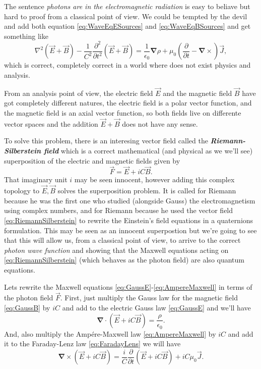     The sentence \textit{photons are in the electromagnetic radiation} is easy to beliave but hard to proof from a classical point of view. We could be tempted by the devil and add both equation \ref{eq:WaveEqESources} and \ref{eq:WaveEqBSources} and get something like
    \begin{equation}\label{eq:WaveEqDevil}
        \nabla^2\left(\vec{E}+\vec{B}\right)- \frac{1}{C^2}\frac{\partial^2}{\partial t^2} \left(\vec{E}+\vec{B}\right) = \frac{1}{\epsilon_0}\bm{\nabla}\rho + \mu_0 \left(\frac{\partial}{\partial t} - \bm{\nabla}\times \right)\vec{J},
    \end{equation}
    which is correct, completely correct in a world where does not exist physics and analysis.

    From an analysis point of view, the electric field $\vec{E}$ and the magnetic field $\vec{B}$ have got completely different natures, the electric field is a polar vector function, and the magnetic field is an axial vector function, so both fields live on differente vector spaces and the addition $\vec{E}+\vec{B}$ does not have any sense.

    To solve this problem, there is an interesing vector field called the \textbf{\textit{Riemann-Silberstein field}} which is a correct mathematical (and physical as we we'll see) superposition of the electric and magnetic fields given by
    \begin{equation}\label{eq:RiemannSilberstein}
        \vec{F} = \vec{E} + iC\vec{B}.
    \end{equation}
    That imaginary unit $i$ may be seen innocent, however adding this complex topology to $\vec{E},\vec{B}$ solves the superposition problem. It is called for Riemann because he was the first one who studied (alongside Gauss) the electromagnetism using complex numbers, and for Riemann because he used the vector field \ref{eq:RiemannSilberstein} to rewrite the Einstein's field equations in a quaternions formulation. This may be seen as an innocent superpostion but we're going to see that this will allow us, from a classical point of view, to arrive to the correct \textit{photon wave function} and showing that the Maxwell equations acting on \ref{eq:RiemannSilberstein} (which behaves as the photon field) are also quantum equations.

    Lets rewrite the Maxwell equations \ref{eq:GaussE}-\ref{eq:AmpereMaxwell} in terms of the photon field $\vec{F}$. First, just multiply the Gauss law for the magnetic field \ref{eq:GaussB} by $iC$ and add to the electric Gauss law \ref{eq:GaussE} and we'll have
    \begin{equation}
        \bm{\nabla}\cdot\left(\vec{E}+iC\vec{B} \right) = \frac{\rho}{\epsilon_0}.
    \end{equation}
    And, also multiply the Ampére-Maxwell law \ref{eq:AmpereMaxwell} by $iC$ and add it to the Faraday-Lenz law \ref{eq:FaradayLens} we will have
    \begin{equation}
        \bm{\nabla}\times \left(\vec{E}+iC\vec{B} \right) = \frac{i}{C}\frac{\partial}{\partial t}\left(\vec{E}+iC\vec{B} \right) + iC\mu_0 \vec{J}.
    \end{equation}

